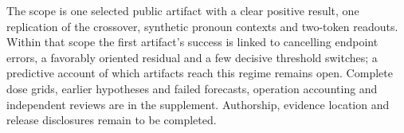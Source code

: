 \documentclass[11pt]{article}
\begin{document}
The scope is one selected public artifact with a clear positive result, one replication of the crossover, synthetic pronoun contexts and two-token readouts. Within that scope the first artifact's success is linked to cancelling endpoint errors, a favorably oriented residual and a few decisive threshold switches; a predictive account of which artifacts reach this regime remains open. Complete dose grids, earlier hypotheses and failed forecasts, operation accounting and independent reviews are in the supplement. Authorship, evidence location and release disclosures remain to be completed.

\clearpage
\small


\end{document}
